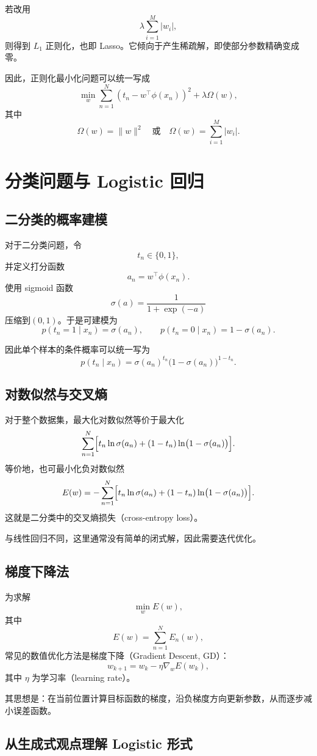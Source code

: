 若改用
\[
\lambda\sum_{i=1}^M |w_i|,
\]
则得到 $L_1$ 正则化，也即 Lasso。它倾向于产生稀疏解，即使部分参数精确变成零。

因此，正则化最小化问题可以统一写成
\[
\min_w
\sum_{n=1}^N (t_n-w^{\top}\phi(x_n))^2
+
\lambda \Omega(w),
\]
其中
\[
\Omega(w)=\|w\|^2
\quad \text{或} \quad
\Omega(w)=\sum_{i=1}^M |w_i|.
\]

\section{分类问题与 Logistic 回归}

\subsection{二分类的概率建模}

对于二分类问题，令
\[
t_n\in\{0,1\},
\]
并定义打分函数
\[
a_n=w^{\top}\phi(x_n).
\]
使用 sigmoid 函数
\[
\sigma(a)=\frac{1}{1+\exp(-a)}
\]
压缩到\((0,1)\)。于是可建模为
\[
p(t_n=1\mid x_n)=\sigma(a_n),\qquad
p(t_n=0\mid x_n)=1-\sigma(a_n).
\]

因此单个样本的条件概率可以统一写为
\[
p(t_n\mid x_n)
=
\sigma(a_n)^{t_n}\bigl(1-\sigma(a_n)\bigr)^{1-t_n}.
\]

\subsection{对数似然与交叉熵}

对于整个数据集，最大化对数似然等价于最大化
\[
\sum_{n=1}^N
\Bigl[
t_n\ln \sigma(a_n)
+
(1-t_n)\ln\bigl(1-\sigma(a_n)\bigr)
\Bigr].
\]
等价地，也可最小化负对数似然
\[
E(w)
=
-\sum_{n=1}^N
\Bigl[
t_n\ln \sigma(a_n)
+
(1-t_n)\ln\bigl(1-\sigma(a_n)\bigr)
\Bigr].
\]
这就是二分类中的交叉熵损失（cross-entropy loss）。

与线性回归不同，这里通常没有简单的闭式解，因此需要迭代优化。

\subsection{梯度下降法}

为求解
\[
\min_w E(w),
\]
其中
\[
E(w)=\sum_{n=1}^N E_n(w),
\]
 常见的数值优化方法是梯度下降（Gradient Descent, GD）：
\[
w_{k+1}=w_k-\eta \nabla_w E(w_k),
\]
其中 $\eta$ 为学习率（learning rate）。

其思想是：在当前位置计算目标函数的梯度，沿负梯度方向更新参数，从而逐步减小误差函数。

\subsection{从生成式观点理解 Logistic 形式}

